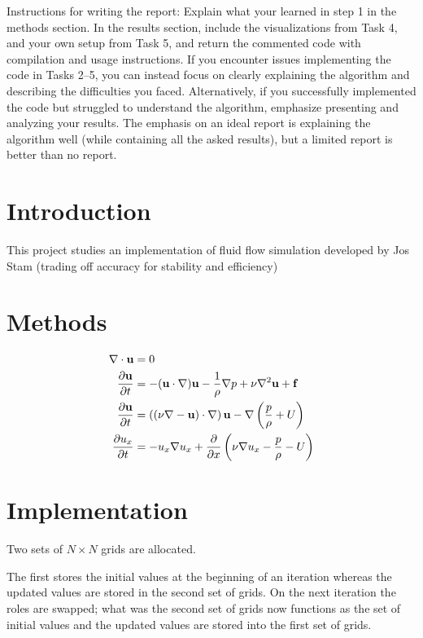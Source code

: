 \documentclass[12pt, letterpaper]{article}
\author{Tom Rindell}
\title{}
\begin{document}
Instructions for writing the report: Explain what your learned in step 1 in the methods section. In the results
section, include the visualizations from Task 4, and your own setup from Task 5, and return the commented code
with compilation and usage instructions. If you encounter issues implementing the code in Tasks 2–5, you can
instead focus on clearly explaining the algorithm and describing the difficulties you faced. Alternatively, if you
successfully implemented the code but struggled to understand the algorithm, emphasize presenting and analyzing
your results. The emphasis on an ideal report is explaining the algorithm well (while containing all the asked
results), but a limited report is better than no report.

\section{Introduction}
This project studies an implementation of fluid flow simulation developed by Jos Stam %
(trading off accuracy for stability and efficiency)

\section{Methods}
\begin{align*}
  \nabla\cdot\vb{u} &= 0 \\
  \frac{\partial\vb{u}}{\partial t} &= -(\vb{u}\cdot \nabla)\vb{u}-\frac{1}{\rho}\nabla p + \nu \nabla^{2}\vb{u} + \vb{f}
  \\\frac{\partial\vb{u}}{\partial t} &= \left( (\nu \nabla-\vb{u} )\cdot \nabla\right) \vb{u}-  \nabla \left(\frac{p}{\rho} + U\right)
  \\\frac{\partial{u_{x}}}{\partial t} &= -{u}_{x} \nabla{u_{x}}+  \frac{\partial}{\partial x} \left(\nu\nabla{u_{x}}-  \frac{p}{\rho} - U\right)
\end{align*}

\section{Implementation}
Two sets of $N\times N$ grids are allocated.

The first stores the initial values at the beginning of an iteration whereas the updated values are stored in the second set of grids.
On the next iteration the roles are swapped; what was the second set of grids now functions as the set of initial values and the updated values are stored into the first set of grids.
\end{document}
